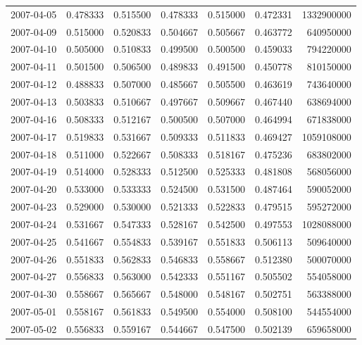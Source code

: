 \begin{tabular}{lrrrrrr}
2007-04-05 &    0.478333 &    0.515500 &    0.478333 &    0.515000 &    0.472331 &  1332900000 \\
2007-04-09 &    0.515000 &    0.520833 &    0.504667 &    0.505667 &    0.463772 &   640950000 \\
2007-04-10 &    0.505000 &    0.510833 &    0.499500 &    0.500500 &    0.459033 &   794220000 \\
2007-04-11 &    0.501500 &    0.506500 &    0.489833 &    0.491500 &    0.450778 &   810150000 \\
2007-04-12 &    0.488833 &    0.507000 &    0.485667 &    0.505500 &    0.463619 &   743640000 \\
2007-04-13 &    0.503833 &    0.510667 &    0.497667 &    0.509667 &    0.467440 &   638694000 \\
2007-04-16 &    0.508333 &    0.512167 &    0.500500 &    0.507000 &    0.464994 &   671838000 \\
2007-04-17 &    0.519833 &    0.531667 &    0.509333 &    0.511833 &    0.469427 &  1059108000 \\
2007-04-18 &    0.511000 &    0.522667 &    0.508333 &    0.518167 &    0.475236 &   683802000 \\
2007-04-19 &    0.514000 &    0.528333 &    0.512500 &    0.525333 &    0.481808 &   568056000 \\
2007-04-20 &    0.533000 &    0.533333 &    0.524500 &    0.531500 &    0.487464 &   590052000 \\
2007-04-23 &    0.529000 &    0.530000 &    0.521333 &    0.522833 &    0.479515 &   595272000 \\
2007-04-24 &    0.531667 &    0.547333 &    0.528167 &    0.542500 &    0.497553 &  1028088000 \\
2007-04-25 &    0.541667 &    0.554833 &    0.539167 &    0.551833 &    0.506113 &   509640000 \\
2007-04-26 &    0.551833 &    0.562833 &    0.546833 &    0.558667 &    0.512380 &   500070000 \\
2007-04-27 &    0.556833 &    0.563000 &    0.542333 &    0.551167 &    0.505502 &   554058000 \\
2007-04-30 &    0.558667 &    0.565667 &    0.548000 &    0.548167 &    0.502751 &   563388000 \\
2007-05-01 &    0.558167 &    0.561833 &    0.549500 &    0.554000 &    0.508100 &   544554000 \\
2007-05-02 &    0.556833 &    0.559167 &    0.544667 &    0.547500 &    0.502139 &   659658000 \\

\end{tabular}
